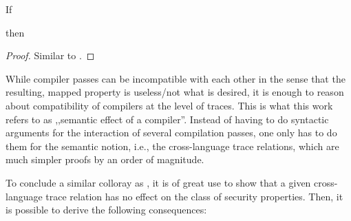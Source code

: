 \begin{lemma}[\Coqed]{}
  If 
  \begin{assumptions}
  \end{assumptions}
  then
  \begin{goals}
  \end{goals}
\end{lemma}
\begin{proof}
  Similar to .
\end{proof}

While compiler passes can be incompatible with each other in the sense that the resulting, mapped property is useless/not what is desired, it is enough to reason about compatibility of compilers at the level of traces.
This is what this work refers to as ,,semantic effect of a compiler''.
Instead of having to do syntactic arguments for the interaction of several compilation passes, one only has to do them for the semantic notion, i.e., the cross-language trace relations, which are much simpler proofs by an order of magnitude. 

To conclude a similar colloray as , it is of great use to show that a given cross-language trace relation has no effect on the class of security properties.
Then, it is possible to derive the following consequences:

